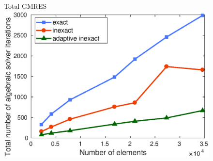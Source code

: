 \documentclass{beamer}
\begin{document}
\begin{frame}
\begin{figure}[H]
\begin{minipage}[c]{.44\linewidth}
\end{minipage} \hfill
\end{figure}
\begin{figure}
\vspace*{-0.04\textwidth} \hspace*{0.1\textwidth}
\begin{minipage}{.41\linewidth} 
\centering   Total GMRES
 \includegraphics[width=\textwidth]{fig_article/comparison_three_methods_total_number_Newton_Gmres_iter_number_elements.eps}     
\end{minipage} \hfill

\label{ref:figure:plot:number:alg:iter:per:newton:step}
\end{figure}
\end{frame}
%
\end{document}
